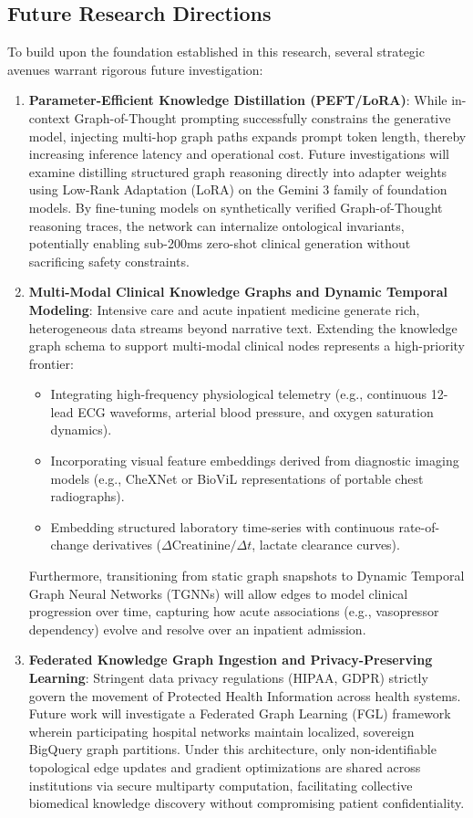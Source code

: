 \documentclass[11pt, a4paper]{article}
\begin{document}
\subsection{Future Research Directions}
To build upon the foundation established in this research, several strategic avenues warrant rigorous future investigation:
\begin{enumerate}
  \item \textbf{Parameter-Efficient Knowledge Distillation (PEFT/LoRA)}: While in-context Graph-of-Thought prompting successfully constrains the generative model, injecting multi-hop graph paths expands prompt token length, thereby increasing inference latency and operational cost. Future investigations will examine distilling structured graph reasoning directly into adapter weights using Low-Rank Adaptation (LoRA) on the Gemini 3 family of foundation models. By fine-tuning models on synthetically verified Graph-of-Thought reasoning traces, the network can internalize ontological invariants, potentially enabling sub-200ms zero-shot clinical generation without sacrificing safety constraints.
  \item \textbf{Multi-Modal Clinical Knowledge Graphs and Dynamic Temporal Modeling}: Intensive care and acute inpatient medicine generate rich, heterogeneous data streams beyond narrative text. Extending the knowledge graph schema to support multi-modal clinical nodes represents a high-priority frontier:
  \begin{itemize}
    \item Integrating high-frequency physiological telemetry (e.g., continuous 12-lead ECG waveforms, arterial blood pressure, and oxygen saturation dynamics).
    \item Incorporating visual feature embeddings derived from diagnostic imaging models (e.g., CheXNet or BioViL representations of portable chest radiographs).
    \item Embedding structured laboratory time-series with continuous rate-of-change derivatives ($\Delta \text{Creatinine}/\Delta t$, lactate clearance curves).
  \end{itemize}
  Furthermore, transitioning from static graph snapshots to Dynamic Temporal Graph Neural Networks (TGNNs) will allow edges to model clinical progression over time, capturing how acute associations (e.g., vasopressor dependency) evolve and resolve over an inpatient admission.
  \item \textbf{Federated Knowledge Graph Ingestion and Privacy-Preserving Learning}: Stringent data privacy regulations (HIPAA, GDPR) strictly govern the movement of Protected Health Information across health systems. Future work will investigate a Federated Graph Learning (FGL) framework wherein participating hospital networks maintain localized, sovereign BigQuery graph partitions. Under this architecture, only non-identifiable topological edge updates and gradient optimizations are shared across institutions via secure multiparty computation, facilitating collective biomedical knowledge discovery without compromising patient confidentiality.

\end{enumerate}
\end{document}
